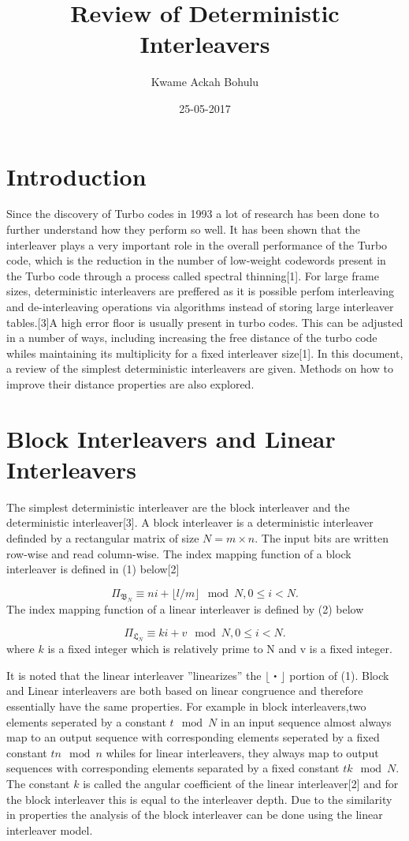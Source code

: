\documentclass[20 pts]{article}
\title{Review of Deterministic Interleavers}
\author{Kwame Ackah Bohulu}
\date{25-05-2017}
\begin{document}
\maketitle


\section{Introduction}
Since the discovery of Turbo codes in 1993 a lot of research has been done to further understand how they perform so well. It has been shown that the interleaver plays a very important role in the overall performance of the Turbo code, which is the reduction in the number of low-weight codewords present in the Turbo code through a process called spectral thinning[1]. For large frame sizes, deterministic interleavers are preffered as it is possible perfom interleaving and de-interleaving operations via algorithms instead of storing large interleaver tables.[3]A high error floor is usually present in turbo codes. This can be adjusted in a number of ways, including increasing the free distance of the turbo code whiles maintaining its multiplicity for a fixed interleaver size[1]. In this document, a review of the simplest deterministic interleavers are given. Methods on how to improve their distance properties are also explored.

\section{Block Interleavers and Linear Interleavers}
The simplest deterministic interleaver are the block interleaver and the deterministic interleaver[3]. A block interleaver is a deterministic interleaver definded by a rectangular matrix of size $N=m\times n$. The input bits are written row-wise and read column-wise. The index mapping function of a block interleaver is defined in (1) below[2]

$$\Pi_{\mathfrak{B}_N} \equiv ni + \lfloor l/m\rfloor \mod {N},		0\leq i < N.$$
The index mapping function of a linear interleaver is defined by (2) below

$$\Pi_{\mathfrak{L}_N} \equiv ki + v \mod {N},		0\leq i < N.$$
where $k$ is a fixed integer which is relatively prime to N and v is a fixed integer.

It is noted that the linear interleaver ''linearizes'' the $\lfloor ・\rfloor$ portion of (1). 
Block and Linear interleavers are both based on linear congruence and therefore essentially have the same properties. For example in block interleavers,two elements seperated by a constant $t\mod {N}$ in an input sequence  almost always map to an output sequence with corresponding elements seperated by a fixed constant $tn\mod{n}$ whiles for linear interleavers, they always map to output sequences with corresponding elements separated by a fixed constant $tk\mod{N}$. The constant $k$ is called the angular coefficient of the linear interleaver[2] and for the block interleaver this is equal to the interleaver depth. Due to the similarity in properties the analysis of the block interleaver can be done using the linear interleaver model.
\end{document}

